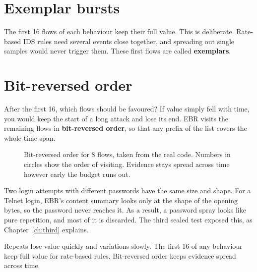 \section{Exemplar bursts}
The first 16 flows of each behaviour keep their full value. This is deliberate. Rate-based IDS rules need several events close together, and spreading out single samples would never trigger them. These first flows are called \textbf{exemplars}.

\section{Bit-reversed order}
After the first 16, which flows should be favoured? If value simply fell with time, you would keep the start of a long attack and lose its end. EBR visits the remaining flows in \textbf{bit-reversed order}, so that any prefix of the list covers the whole time span.

\begin{figure}[H]
\centering
{}
\caption{Bit-reversed order for 8 flows, taken from the real code. Numbers in circles show the order of visiting. Evidence stays spread across time however early the budget runs out.}
\end{figure}

\begin{careful}
Two login attempts with different passwords have the same size and shape. For a Telnet login, EBR's content summary looks only at the shape of the opening bytes, so the password never reaches it. As a result, a password spray looks like pure repetition, and most of it is discarded. The third sealed test exposed this, as Chapter~\ref{ch:third} explains.
\end{careful}

\begin{recap}
Repeats lose value quickly and variations slowly. The first 16 of any behaviour keep full value for rate-based rules. Bit-reversed order keeps evidence spread across time.
\end{recap}

